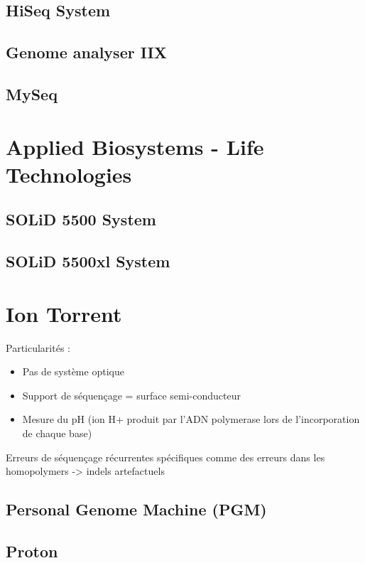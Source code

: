\documentclass[a4paper]{article}
\begin{document}
\subsection{HiSeq System}

\subsection{Genome analyser IIX}

\subsection{MySeq}

\section{Applied Biosystems - Life Technologies}

\subsection{SOLiD 5500 System}

\subsection{SOLiD 5500xl System}

\section{Ion Torrent}

Particularités :
\begin{itemize}
\item Pas de système optique
\item Support de séquençage = surface semi-conducteur 
\item Mesure du pH (ion H+ produit par l’ADN polymerase lors de l’incorporation de chaque base)
\end{itemize}

Erreurs de séquençage récurrentes spécifiques comme des erreurs dans les homopolymers -> indels artefactuels

\subsection{Personal Genome Machine (PGM)}

\subsection{Proton}
\end{document}
